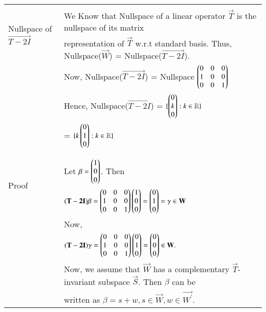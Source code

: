 \begin{table*}[!ht]
	\begin{tabular}{|l|l|}
		\hline
		\multirow{3}{*}{Nullspace of $\vec{T-2I}$ } & \\
		& We Know that Nullspace of a linear operator $\vec{T}$ is the nullspace of its matrix \\
		& representation of $\vec{T}$ w.r.t standard basis. Thus, Nullspace($\vec{W}$) = Nullspace($\vec{T-2I}$). \\
		& Now, Nullspace($\vec{T-2I}$) =  Nullspace $\begin{pmatrix}0 & 0 & 0 \\  1 & 0 & 0 \\ 0 & 0 &1 \end{pmatrix}$\\
		&  Hence, Nullspace($\vec{T-2I}$) = $\{ \begin{pmatrix}0 \\ k \\ 0\end{pmatrix}: k \in \mathbb{R}\}$\\
		&\qquad \qquad \qquad \qquad \qquad \quad = $\{k\begin{pmatrix}0 \\ 1 \\ 0\end{pmatrix}:k \in \mathbb{R} \}$ \\
		& \\
		\hline
		\multirow{3}{*}{ \qquad Proof} & \\
		& Let $\beta = \begin{pmatrix}1 \\ 0 \\0\end{pmatrix}$. Then\\
        & \qquad \qquad \qquad $ (\mathbf{T-2I})\beta = \begin{pmatrix}0 & 0 & 0 \\  1 & 0 & 0 \\ 0 & 0 & 1\end{pmatrix}\begin{pmatrix}1 \\ 0 \\0\end{pmatrix} = \begin{pmatrix}0 \\ 1 \\ 0\end{pmatrix} = \gamma \in \mathbf{W} $ \\
    	& Now, \\
        & \qquad \qquad \qquad $ (\mathbf{T-2I})\gamma = \begin{pmatrix}0 & 0 & 0 \\  1 & 0 & 0 \\ 0 & 0 & 1\end{pmatrix}\begin{pmatrix}0 \\ 1 \\0\end{pmatrix} = \begin{pmatrix}0 \\ 0 \\ 0\end{pmatrix} \in \mathbf{W}. $\\
        & Now, we assume that $\vec{W}$ has a complementary $\vec{T}$-invariant subspace $\vec{S}$. Then $\beta$ can be  \\
        & written as $\beta = s + w, s\in \vec{W}, w \in \vec{W^{'}}$. \\

\end{tabular}
\end{table*}
